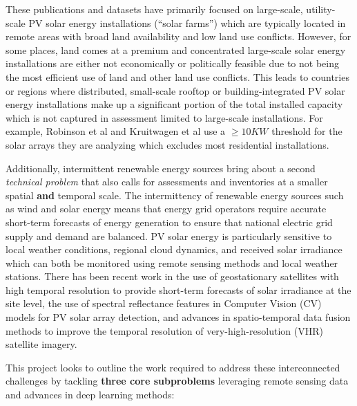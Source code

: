 These publications and datasets have primarily focused on large-scale, utility-scale PV solar energy installations (``solar farms'') which are 
typically located in remote areas with broad land availability and low land use conflicts. However, for some places, land comes at a premium and concentrated large-scale solar energy installations are 
either not economically or politically feasible due to not being the most efficient use of land and other land use conflicts. This leads to countries or regions where distributed, small-scale rooftop or building-integrated 
PV solar energy installations make up a significant portion of the total installed capacity which is not captured in assessment limited to large-scale installations. 
For example, Robinson et al\cite{robinson_ms_planet_global_renewables_watch_2025} and Kruitwagen et al\cite{kruitwagen_global_inventory_pv_units_2021} use a $\ge10KW$ threshold for the solar arrays they are analyzing which excludes most residential installations.  

Additionally, intermittent renewable energy sources bring about a second \textit{technical problem} that also calls for assessments and inventories at a smaller spatial \textbf{and} temporal scale. The intermittency of renewable energy sources such as wind and solar energy means that energy grid operators require accurate short-term forecasts of energy generation to ensure that national electric grid 
supply and demand are balanced. PV solar energy is particularly sensitive to local weather conditions, regional cloud dynamics, and received solar irradiance which can both be monitored using 
remote sensing methods and local weather stations\cite{Li_solarcube_solar_forecasting_2024}\cite{Boussif_neurips_day_ahead_solar_forecasting_2023}. There has been recent work in the use of geostationary satellites with high temporal resolution to provide short-term forecasts of solar irradiance at the site level\cite{Bansal_ssl_nowcasting_2022}, 
the use of spectral reflectance features in Computer Vision (CV) models for PV solar array detection\cite{He_universal_pv_spectral_index_2024}, and advances in spatio-temporal data fusion methods to improve the temporal resolution of very-high-resolution (VHR) satellite imagery\cite{Tremenbert_Kasmi_pyPV_roof_2023}. 

This project looks to outline the work required to address these interconnected challenges by tackling \textbf{three core subproblems} leveraging remote sensing data and advances in deep learning methods:

